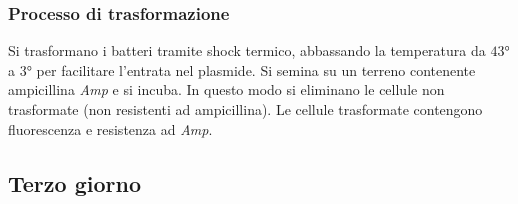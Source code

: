 		\subsubsection{Processo di trasformazione}
		Si trasformano i batteri tramite shock termico, abbassando la temperatura da $43\si{\degree}$ a $3\si{\degree}$ per facilitare l'entrata nel plasmide.
		Si semina su un terreno contenente ampicillina \emph{Amp} e si incuba.
		In questo modo si eliminano le cellule non trasformate (non resistenti ad ampicillina).
		Le cellule trasformate contengono fluorescenza e resistenza ad \emph{Amp}.

	\subsection{Terzo giorno}

